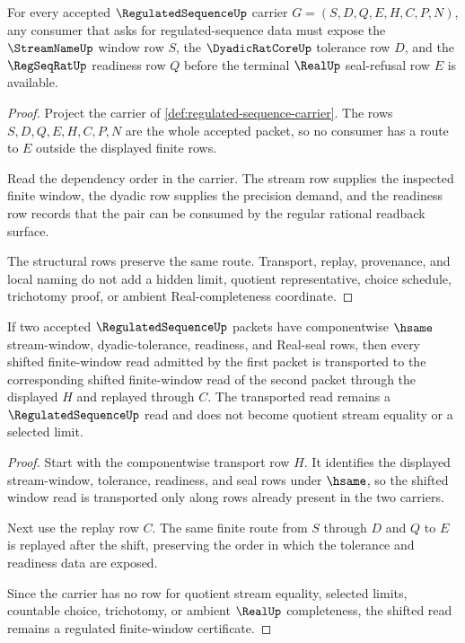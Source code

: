 \begin{theorem}
\label{thm:regulated-sequence-window-obligations}
For every accepted $\RegulatedSequenceUp$ carrier $G=(S,D,Q,E,H,C,P,N)$, any consumer that asks for regulated-sequence data must expose the $\StreamNameUp$ window row $S$, the $\DyadicRatCoreUp$ tolerance row $D$, and the $\RegSeqRatUp$ readiness row $Q$ before the terminal $\RealUp$ seal-refusal row $E$ is available.
\end{theorem}
\begin{proof}
Project the carrier of \autoref{def:regulated-sequence-carrier}. The rows $S,D,Q,E,H,C,P,N$ are the whole accepted packet, so no consumer has a route to $E$ outside the displayed finite rows.

Read the dependency order in the carrier. The stream row supplies the inspected finite window, the dyadic row supplies the precision demand, and the readiness row records that the pair can be consumed by the regular rational readback surface.

The structural rows preserve the same route. Transport, replay, provenance, and local naming do not add a hidden limit, quotient representative, choice schedule, trichotomy proof, or ambient Real-completeness coordinate.
\end{proof}

\begin{theorem}
\label{thm:regulated-sequence-shift-stability}
If two accepted $\RegulatedSequenceUp$ packets have componentwise $\hsame$ stream-window, dyadic-tolerance, readiness, and Real-seal rows, then every shifted finite-window read admitted by the first packet is transported to the corresponding shifted finite-window read of the second packet through the displayed $H$ and replayed through $C$. The transported read remains a $\RegulatedSequenceUp$ read and does not become quotient stream equality or a selected limit.
\end{theorem}
\begin{proof}
Start with the componentwise transport row $H$. It identifies the displayed stream-window, tolerance, readiness, and seal rows under $\hsame$, so the shifted window read is transported only along rows already present in the two carriers.

Next use the replay row $C$. The same finite route from $S$ through $D$ and $Q$ to $E$ is replayed after the shift, preserving the order in which the tolerance and readiness data are exposed.

Since the carrier has no row for quotient stream equality, selected limits, countable choice, trichotomy, or ambient $\RealUp$ completeness, the shifted read remains a regulated finite-window certificate.
\end{proof}

